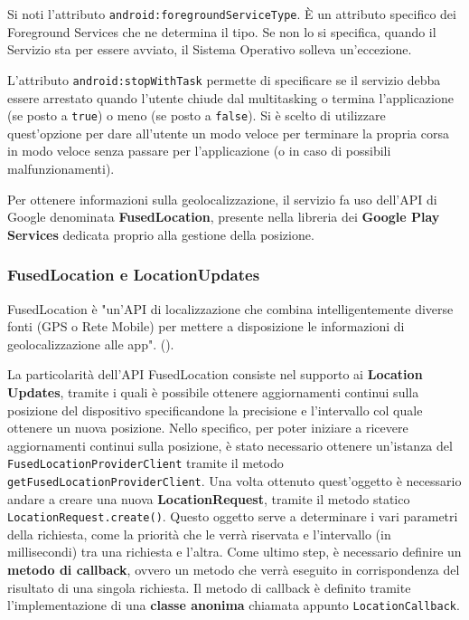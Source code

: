                     Si noti l'attributo \texttt{android:foregroundServiceType}. È un attributo specifico dei Foreground Services che ne determina il tipo. Se non lo si specifica, quando il Servizio sta per essere avviato, il Sistema Operativo solleva un'eccezione.

                    L'attributo \texttt{android:stopWithTask} permette di specificare se il servizio debba essere arrestato quando l'utente chiude dal multitasking o termina l'applicazione (se posto a \texttt{true}) o meno (se posto a \texttt{false}). Si è scelto di utilizzare quest'opzione per dare all'utente un modo veloce per terminare la propria corsa in modo veloce senza passare per l'applicazione (o in caso di possibili malfunzionamenti).

                    Per ottenere informazioni sulla geolocalizzazione, il servizio fa uso dell'API di Google denominata \textbf{FusedLocation}, presente nella libreria dei \textbf{Google Play Services} dedicata proprio alla gestione della posizione.

                    \subsubsection{FusedLocation e LocationUpdates}
                        FusedLocation è "un'API di localizzazione che combina intelligentemente diverse fonti (GPS o Rete Mobile) per mettere a disposizione le informazioni di geolocalizzazione alle app". (\cite{PlayServicesFusedLocation}).

                        La particolarità dell'API FusedLocation consiste nel supporto ai \textbf{Location Updates}, tramite i quali è possibile ottenere aggiornamenti continui sulla posizione del dispositivo specificandone la precisione e l'intervallo col quale ottenere un nuova posizione.
                        Nello specifico, per poter iniziare a ricevere aggiornamenti continui sulla posizione, è stato necessario ottenere un'istanza del \texttt{FusedLocationProviderClient} tramite il metodo 
                        \texttt{getFusedLocationProviderClient}.
                        Una volta ottenuto quest'oggetto è necessario andare a creare una nuova \textbf{LocationRequest}, tramite il metodo statico \texttt{LocationRequest.create()}. Questo oggetto serve a determinare i vari parametri della richiesta, come la priorità che le verrà riservata e l'intervallo (in millisecondi) tra una richiesta e l'altra.
                        Come ultimo step, è necessario definire un \textbf{metodo di callback}, ovvero un metodo che verrà eseguito in corrispondenza del risultato di una singola richiesta. Il metodo di callback è definito tramite l'implementazione di una \textbf{classe anonima} chiamata appunto \texttt{LocationCallback}.